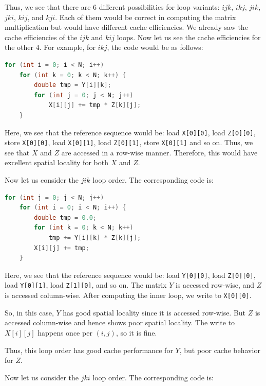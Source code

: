 \documentclass[12pt]{book}
\begin{document}
Thus, we see that there are 6 different possibilities for loop variants: $ijk$, $ikj$, $jik$, $jki$, $kij$, and $kji$. Each of them would be correct in computing the matrix multiplication but would have different cache efficiencies. We already saw the cache efficiencies of the $ijk$ and $kij$ loops. Now let us see the cache efficiencies for the other 4. For example, for $ikj$, the code would be as follows:

\begin{lstlisting}[language=C++, caption={Matrix multiplication with loop order ikj}, label={lst:ikj-matmul}]
for (int i = 0; i < N; i++)
    for (int k = 0; k < N; k++) {
        double tmp = Y[i][k];
        for (int j = 0; j < N; j++)        
            X[i][j] += tmp * Z[k][j];
    }
\end{lstlisting}

Here, we see that the reference sequence would be: load \texttt{X[0][0]}, load \texttt{Z[0][0]}, store \texttt{X[0][0]}, load \texttt{X[0][1]}, load \texttt{Z[0][1]}, store \texttt{X[0][1]} and so on. Thus, we see that $X$ and $Z$ are accessed in a row-wise manner. Therefore, this would have excellent spatial locality for both $X$ and $Z$.

Now let us consider the $jik$ loop order. The corresponding code is:

\begin{lstlisting}[language=C++, caption={Matrix multiplication with loop order jik}, label={lst:jik-matmul}]
for (int j = 0; j < N; j++)
    for (int i = 0; i < N; i++) {
        double tmp = 0.0;
        for (int k = 0; k < N; k++)
            tmp += Y[i][k] * Z[k][j];
        X[i][j] += tmp;
    }
\end{lstlisting}

Here, we see that the reference sequence would be: load \texttt{Y[0][0]}, load \texttt{Z[0][0]}, load \texttt{Y[0][1]}, load \texttt{Z[1][0]}, and so on. The matrix $Y$ is accessed row-wise, and $Z$ is accessed column-wise. After computing the inner loop, we write to \texttt{X[0][0]}.

So, in this case, $Y$ has good spatial locality since it is accessed row-wise. But $Z$ is accessed column-wise and hence shows poor spatial locality. The write to $X[i][j]$ happens once per $(i,j)$, so it is fine.

Thus, this loop order has good cache performance for $Y$, but poor cache behavior for $Z$.
 
Now let us consider the $jki$ loop order. The corresponding code is:
\end{document}
